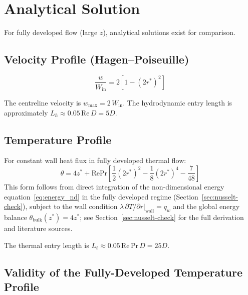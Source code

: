 \documentclass[12pt,a4paper]{article}
\newcommand{\Rey}{\text{Re}}
\newcommand{\Pran}{\text{Pr}}
\begin{document}
\newpage

\section{Analytical Solution}

For fully developed flow (large $z$), analytical solutions exist for comparison.

\subsection{Velocity Profile (Hagen--Poiseuille)}

\begin{equation}
    \frac{w}{W_{\text{in}}} = 2\left[1 - (2r^*)^2\right]
    \label{eq:analytical_velocity}
\end{equation}

The centreline velocity is $w_{\max} = 2\,W_{\text{in}}$.
The hydrodynamic entry length is approximately $L_h \approx 0.05\,\Rey\,D = 5D$.

\subsection{Temperature Profile}

For constant wall heat flux in fully developed thermal flow:
\begin{equation}
    \theta = 4z^* + \Rey\Pran\left[\frac{1}{2}(2r^*)^2 - \frac{1}{8}(2r^*)^4 - \frac{7}{48}\right]
    \label{eq:analytical_temperature}
\end{equation}
This form follows from direct integration of the non-dimensional energy
equation~\eqref{eq:energy_nd} in the fully developed regime (Section~\ref{sec:nusselt-check}),
subject to the wall condition $\lambda\,\partial T/\partial r|_{\text{wall}}=q_w$ and the global
energy balance $\theta_{\text{bulk}}(z^*) = 4z^*$; see Section~\ref{sec:nusselt-check} for the
full derivation and literature sources.

The thermal entry length is $L_t \approx 0.05\,\Rey\,\Pran\,D = 25D$.

\subsection{Validity of the Fully-Developed Temperature Profile}
\label{sec:fd-validity}
\end{document}

